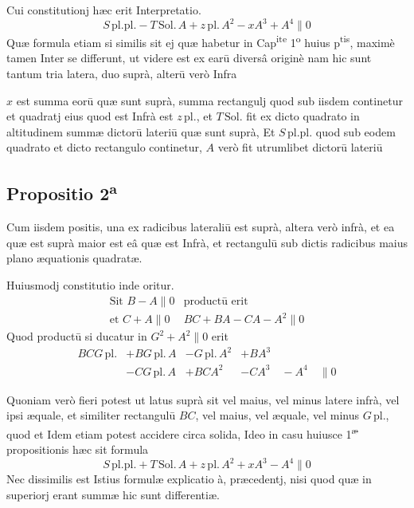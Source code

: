 \documentclass[11pt,a4paper]{article}
\begin{document}
Cui constitutionj hæc erit Interpretatio.
\[ S\,\mathrm{pl.pl.} - T\,\mathrm{Sol.}\,A + z\,\mathrm{pl.}\,A^{2} - xA^{3} + A^{4} \parallel 0 \]
Quæ formula etiam si similis sit ej quæ habetur in Cap\textsuperscript{ite} 1\textsuperscript{o} huius p\textsuperscript{tis}, maximè tamen Inter se differunt, ut videre est ex earū diversâ originè nam hic sunt tantum tria latera, duo suprà, alterū verò Infra


$x$ est summa eorū quæ sunt suprà, summa rectangulj quod sub iisdem continetur et quadratj eius quod est Infrà est $z\,\mathrm{pl.}$, et $T\,\mathrm{Sol.}$ fit ex dicto quadrato in altitudinem summæ dictorū lateriū quæ sunt suprà, Et $S\,\mathrm{pl.pl.}$ quod sub eodem quadrato et dicto rectangulo continetur, $A$ verò fit utrumlibet dictorū lateriū

\subsection*{Propositio 2\textsuperscript{a}}

Cum iisdem positis, una ex radicibus lateraliū est suprà, altera verò infrà, et ea quæ est suprà maior est eâ quæ est Infrà, et rectangulū sub dictis radicibus maius plano æquationis quadratæ.

Huiusmodj constitutio inde oritur.
\[ \begin{array}{ll} \text{Sit } B - A \parallel 0 & \text{productū erit} \\ \text{et } C + A \parallel 0 & BC + BA - CA - A^{2} \parallel 0 \end{array} \]
Quod productū si ducatur in $G^{2} + A^{2} \parallel 0$ erit
\[ \begin{array}{llll} BCG\,\mathrm{pl.} & + BG\,\mathrm{pl.}\,A & - G\,\mathrm{pl.}\,A^{2} & + BA^{3} \\ & - CG\,\mathrm{pl.}\,A & + BCA^{2} & - CA^{3} \quad - A^{4} \quad \parallel 0 \end{array} \]

Quoniam verò fieri potest ut latus suprà sit vel maius, vel minus latere infrà, vel ipsi æquale, et similiter rectangulū $BC$, vel maius, vel æquale, vel minus $G\,\mathrm{pl.}$, quod et Idem etiam potest accidere circa solida, Ideo in casu huiusce 1\textsuperscript{æ} propositionis hæc sit formula
\[ S\,\mathrm{pl.pl.} + T\,\mathrm{Sol.}\,A + z\,\mathrm{pl.}\,A^{2} + xA^{3} - A^{4} \parallel 0 \]
Nec dissimilis est Istius formulæ explicatio à, præcedentj, nisi quod  quæ in superiorj erant summæ hic sunt differentiæ.
\end{document}
